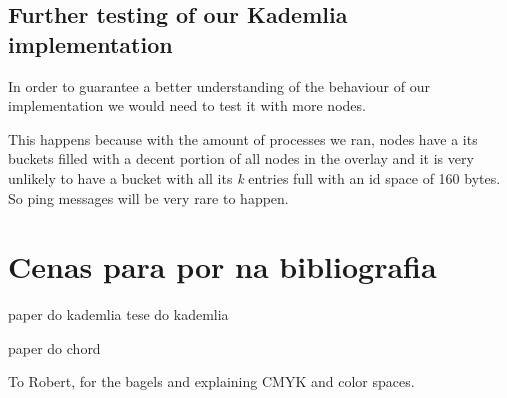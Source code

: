 \documentclass[sigconf]{acmart}
\begin{document}
\subsection{Further testing of our Kademlia implementation}
In order to guarantee a better understanding of the behaviour of our implementation we would need to test it with more nodes.

This happens because with the amount of processes we ran, nodes have a its buckets filled with a decent portion of all nodes in the overlay and it is very unlikely to have a bucket with all its \emph{k} entries full with an id space of 160 bytes. So ping messages will be very rare to happen.


\section{Cenas para por na bibliografia}

paper do kademlia
tese do kademlia

paper do chord



\begin{acks}
To Robert, for the bagels and explaining CMYK and color spaces.
\end{acks}



\end{document}
